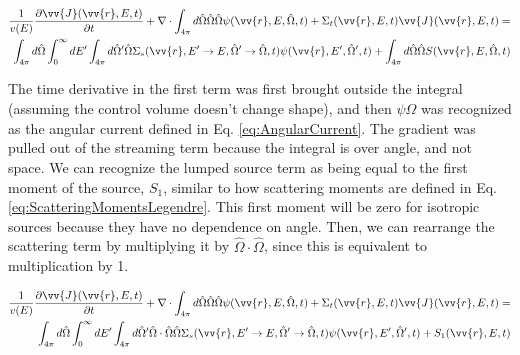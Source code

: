 \documentclass[10pt]{article}
\newcommand{\beqa}{\begin{equation}\begin{aligned}}
\newcommand{\eeqa}{\end{aligned}\end{equation}}
\newcommand{\hO}{\hat{\Omega}}
\newcommand{\spa}{(\vv{r}, E, \hO, t)}
\newcommand{\spas}{(\vv{r},E,t)}
\newcommand{\spap}{(\vv{r}, E', \hO',t)}
\newcommand{\spang}{(\vv{r},E'\rightarrow E, \hO'\rightarrow\hO,t)}
\begin{document}
\begin{flushleft}
\beqa
\label{eq:TEAngleAngleIntegrated}
\frac{1}{v(E)} \frac{\partial\vv{J}\spas}{\partial t} +
 \nabla\cdot \int_{4\pi}^{} d\hO  \hO  \hO  \psi\spa  + 
 \Sigma_t\spas\vv{J}\spas = \\
 \int_{4\pi}^{} d\hO\int_{0}^{\infty}dE' \int_{4\pi}^{ } d\hO  ' \hO  \Sigma_s\spang\psi\spap + \int_{4\pi}^{} d\hO  \hO  S\spa\\
\eeqa

The time derivative in the first term was first brought outside the integral (assuming the control volume doesn't change shape), and then \(\psi\hO  \) was recognized as the angular current defined in Eq. \ref{eq:AngularCurrent}. The gradient was pulled out of the streaming term because the integral is over angle, and not space. We can recognize the lumped source term as being equal to the first moment of the source, \(S_1\), similar to how scattering moments are defined in Eq. \ref{eq:ScatteringMomentsLegendre}. This first moment will be zero for isotropic sources because they have no dependence on angle. Then, we can rearrange the scattering term by multiplying it by \(\hO  \cdot\hO  \), since this is equivalent to multiplication by 1. 

\beqa
\label{eq:TEAngleAngleIntegrated}
\frac{1}{v(E)} \frac{\partial\vv{J}\spas}{\partial t} +
 \nabla\cdot \int_{4\pi}^{} d\hO   \hO  \hO  \psi\spa  + 
 \Sigma_t\spas\vv{J}\spas = \\
 \int_{4\pi}^{} d\hO   \int_{0}^{\infty}dE' \int_{4\pi}^{ } d\hO  ' \hO  \cdot\hO   \hO  \Sigma_s\spang\psi\spap + S_1\spas\\
\eeqa

\end{flushleft}
\end{document}
